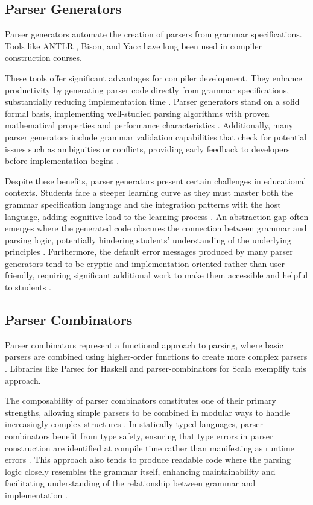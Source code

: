 \subsection{Parser Generators}

Parser generators automate the creation of parsers from grammar specifications. Tools like ANTLR \cite{parr2013definitive}, Bison, and Yacc have long been used in compiler construction courses.

These tools offer significant advantages for compiler development. They enhance productivity by generating parser code directly from grammar specifications, substantially reducing implementation time \cite{levine2009flex}. Parser generators stand on a solid formal basis, implementing well-studied parsing algorithms with proven mathematical properties and performance characteristics \cite{aho2007compilers}. Additionally, many parser generators include grammar validation capabilities that check for potential issues such as ambiguities or conflicts, providing early feedback to developers before implementation begins \cite{parr2013definitive}.

Despite these benefits, parser generators present certain challenges in educational contexts. Students face a steeper learning curve as they must master both the grammar specification language and the integration patterns with the host language, adding cognitive load to the learning process \cite{sestoft2017programming}. An abstraction gap often emerges where the generated code obscures the connection between grammar and parsing logic, potentially hindering students' understanding of the underlying principles \cite{grune2012modern}. Furthermore, the default error messages produced by many parser generators tend to be cryptic and implementation-oriented rather than user-friendly, requiring significant additional work to make them accessible and helpful to students \cite{tratt2010parsing}.

\subsection{Parser Combinators}

Parser combinators represent a functional approach to parsing, where basic parsers are combined using higher-order functions to create more complex parsers \cite{hutton1992higher}. Libraries like Parsec for Haskell and parser-combinators for Scala exemplify this approach.

The composability of parser combinators constitutes one of their primary strengths, allowing simple parsers to be combined in modular ways to handle increasingly complex structures \cite{leijen2001parsec}. In statically typed languages, parser combinators benefit from type safety, ensuring that type errors in parser construction are identified at compile time rather than manifesting as runtime errors \cite{marlow2011haskell}. This approach also tends to produce readable code where the parsing logic closely resembles the grammar itself, enhancing maintainability and facilitating understanding of the relationship between grammar and implementation \cite{moors2008parser}.

